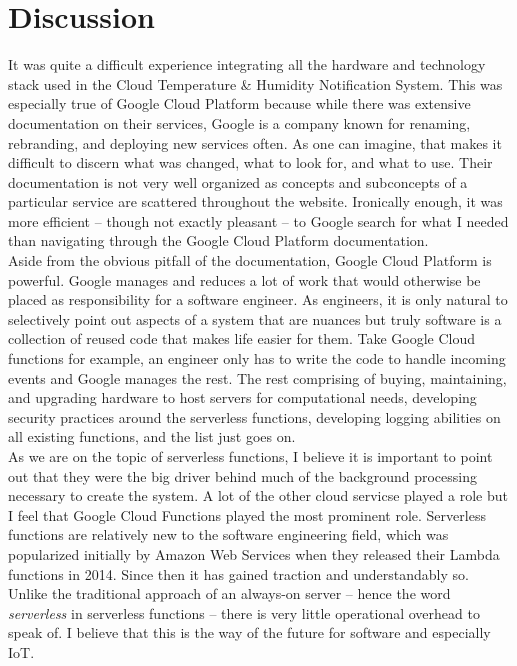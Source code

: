 \documentclass{article}
\begin{document}
\section{Discussion}
It was quite a difficult experience integrating all the hardware and technology stack used in the Cloud Temperature \& Humidity Notification System. This was especially true of Google Cloud Platform because while there was extensive documentation on their services, Google is a company known for renaming, rebranding, and deploying new services often. As one can imagine, that makes it difficult to discern what was changed, what to look for, and what to use. Their documentation is not very well organized as concepts and subconcepts of a particular service are scattered throughout the website. Ironically enough, it was more efficient -- though not exactly pleasant -- to Google search for what I needed than navigating through the Google Cloud Platform documentation.\\

Aside from the obvious pitfall of the documentation, Google Cloud Platform is powerful. Google manages and reduces a lot of work that would otherwise be placed as responsibility for a software engineer. As engineers, it is only natural to selectively point out aspects of a system that are nuances but truly software is a collection of reused code that makes life easier for them. Take Google Cloud functions for example, an engineer only has to write the code to handle incoming events and Google manages the rest. The rest comprising of buying, maintaining, and upgrading hardware to host servers for computational needs, developing security practices around the serverless functions, developing logging abilities on all existing functions, and the list just goes on.\\

As we are on the topic of serverless functions, I believe it is important to point out that they were the big driver behind much of the background processing necessary to create the system. A lot of the other cloud servicse played a role but I feel that Google Cloud Functions played the most prominent role. Serverless functions are relatively new to the software engineering field, which was popularized initially by Amazon Web Services when they released their Lambda functions in 2014. Since then it has gained traction and understandably so. Unlike the traditional approach of an always-on server -- hence the word \textit{serverless} in serverless functions -- there is very little operational overhead to speak of. I believe that this is the way of the future for software and especially IoT.\\
\end{document}

